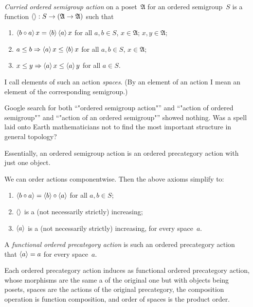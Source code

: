 \begin{defn}
\emph{Curried ordered semigroup action} on a poset~$\mathfrak{A}$ for an ordered semigroup~$S$ is a function $\left\langle \right\rangle:S\to(\mathfrak{A}\to\mathfrak{A})$ such that
\begin{enumerate}
\item $\left\langle b\circ a\right\rangle x = \left\langle b\right\rangle\left\langle a\right\rangle x$ for all $a,b\in S$, $x\in\mathfrak{A}$;
$x,y\in\mathfrak{A}$;
\item $a\leq b\Rightarrow\left\langle a\right\rangle x\leq \left\langle b\right\rangle x$ for all $a,b\in S$, $x\in\mathfrak{A}$;
\item $x\leq y\Rightarrow\left\langle a\right\rangle x\leq \left\langle a\right\rangle y$ for all $a\in S$.
\end{enumerate}
I call elements of such an action \emph{spaces}. (By an element of an action I mean an element of the corresponding semigroup.)
\end{defn}

\begin{rem}
Google search for both ``"ordered semigroup action"'' and ``"action of ordered semigroup"'' and ``"action of an ordered semigroup"'' showed nothing. Was a spell laid onto Earth mathematicians not to find the most important structure in general topology?
\end{rem}

Essentially, an ordered semigroup action is an ordered precategory action with just one object.

We can order actions componentwise. Then the above axioms simplify to:
\begin{enumerate}
\item $\left\langle b\circ a\right\rangle = \left\langle b\right\rangle\circ\left\langle a\right\rangle$ for all $a,b\in S$;
\item $\left\langle \right\rangle$ is a (not necessarily strictly) increasing;
\item $\left\langle a\right\rangle$ is a (not necessarily strictly) increasing, for every space~$a$.
\end{enumerate}

\begin{defn}
A \emph{functional ordered precategory action} is such an ordered precategory action that $\left\langle a\right\rangle=a$ for every space~$a$.
\end{defn}

\begin{thm}
Each ordered precategory action induces as functional ordered precategory action, whose morphisms are the same a of the original one but with objects being posets, spaces are the actions of the original precategory, the composition operation is function composition, and order of spaces is the product order.
\end{thm}

